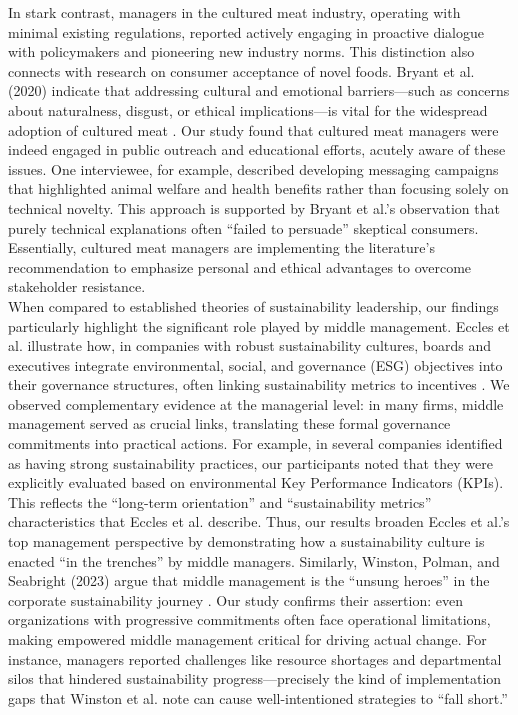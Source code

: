 	In stark contrast, managers in the cultured meat industry, operating with minimal existing regulations, reported actively engaging in proactive dialogue with policymakers and pioneering new industry norms. This distinction also connects with research on consumer acceptance of novel foods. Bryant et al. (2020) indicate that addressing cultural and emotional barriers—such as concerns about naturalness, disgust, or ethical implications—is vital for the widespread adoption of cultured meat \cite{Bryant2020}. Our study found that cultured meat managers were indeed engaged in public outreach and educational efforts, acutely aware of these issues. One interviewee, for example, described developing messaging campaigns that highlighted animal welfare and health benefits rather than focusing solely on technical novelty. This approach is supported by Bryant et al.’s observation that purely technical explanations often ``failed to persuade'' skeptical consumers. Essentially, cultured meat managers are implementing the literature’s recommendation to emphasize personal and ethical advantages to overcome stakeholder resistance. \\
	
	When compared to established theories of sustainability leadership, our findings particularly highlight the significant role played by middle management. Eccles et al. illustrate how, in companies with robust sustainability cultures, boards and executives integrate environmental, social, and governance (ESG) objectives into their governance structures, often linking sustainability metrics to incentives \cite{Eccles2014}. We observed complementary evidence at the managerial level: in many firms, middle management served as crucial links, translating these formal governance commitments into practical actions. For example, in several companies identified as having strong sustainability practices, our participants noted that they were explicitly evaluated based on environmental Key Performance Indicators (KPIs). This reflects the ``long-term orientation'' and ``sustainability metrics'' characteristics that Eccles et al. describe. Thus, our results broaden Eccles et al.’s top management perspective by demonstrating how a sustainability culture is enacted ``in the trenches'' by middle managers. Similarly, Winston, Polman, and Seabright (2023) argue that middle management is the ``unsung heroes'' in the corporate sustainability journey \cite{Winston2023}. Our study confirms their assertion: even organizations with progressive commitments often face operational limitations, making empowered middle management critical for driving actual change. For instance, managers reported challenges like resource shortages and departmental silos that hindered sustainability progress—precisely the kind of implementation gaps that Winston et al. note can cause well-intentioned strategies to ``fall short.'' \\
	
